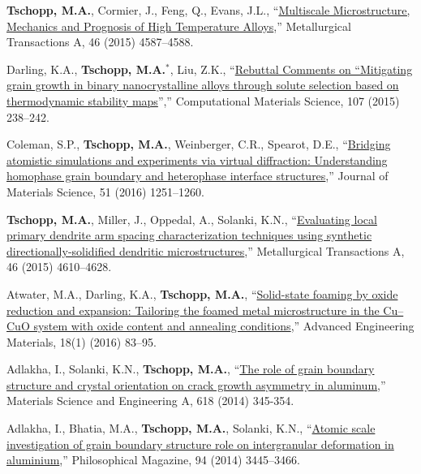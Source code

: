 \begin{cvlist}
\item
\textbf{Tschopp, M.A.}, Cormier, J., Feng, Q., Evans, J.L., ``\href{http://dx.doi.org/10.1007/s11661-015-2992-3}{Multiscale Microstructure, Mechanics and Prognosis of High Temperature Alloys},'' Metallurgical Transactions A, 46 (2015) 4587--4588.

\item
Darling, K.A., \textbf{Tschopp, M.A.}$^\ast$, Liu, Z.K., ``\href{http://dx.doi.org/10.1016/j.commatsci.2015.04.052}{Rebuttal Comments on ``Mitigating grain growth in binary nanocrystalline alloys through solute selection based on thermodynamic stability maps}'','' Computational Materials Science, 107 (2015) 238--242.

\item
{Coleman, S.P.}, \textbf{Tschopp, M.A.}, Weinberger, C.R., Spearot, D.E., ``\href{http://dx.doi.org/10.1007/s10853-015-9087-9}{Bridging atomistic simulations and experiments via virtual diffraction: Understanding homophase grain boundary and heterophase interface structures},'' Journal of Materials Science, 51 (2016) 1251--1260.

\item
\textbf{Tschopp, M.A.}, Miller, J., Oppedal, A., Solanki, K.N., ``\href{http://dx.doi.org/10.1007/s11661-015-2964-7}{Evaluating local primary dendrite arm spacing characterization techniques using synthetic directionally-solidified dendritic microstructures},'' Metallurgical Transactions A, 46 (2015) 4610--4628.

\item
Atwater, M.A., Darling, K.A., \textbf{Tschopp, M.A.}, ``\href{http://dx.doi.org/10.1002/adem.201500063}{Solid-state foaming by oxide reduction and expansion: Tailoring the foamed metal microstructure in the Cu--CuO system with oxide content and annealing conditions},'' Advanced Engineering Materials, 18(1) (2016) 83--95.

\item
{Adlakha, I.}, Solanki, K.N., \textbf{Tschopp, M.A.}, ``\href{http://dx.doi.org/10.1016/j.msea.2014.08.083}{The role of grain boundary structure and crystal orientation on crack growth asymmetry in aluminum},'' Materials Science and Engineering A, 618 (2014) 345-354.

\item
{Adlakha, I.}, {Bhatia, M.A.}, \textbf{Tschopp, M.A.}, Solanki, K.N.,  ``\href{http://dx.doi.org/10.1080/14786435.2014.961585}{Atomic scale investigation of grain boundary structure role on intergranular deformation in aluminium},'' Philosophical Magazine, 94 (2014) 3445--3466.


\end{cvlist}
